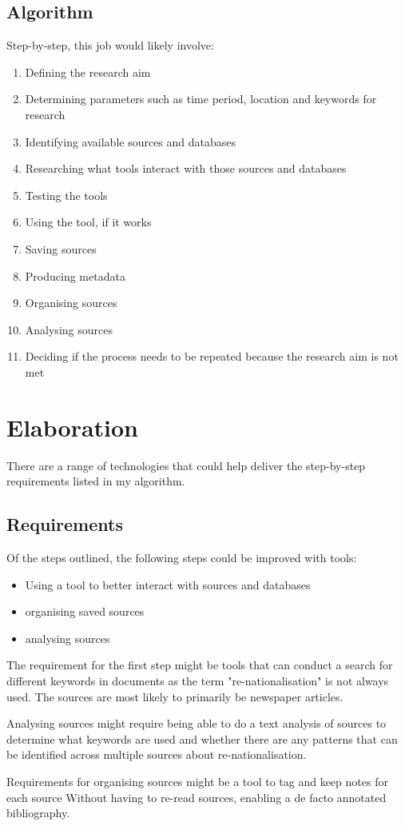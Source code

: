 \documentclass{article}
\begin{document}
\subsection*{Algorithm}
Step-by-step, this job would likely involve:
\begin{enumerate}
\item Defining the research aim
\item Determining parameters such as time period, location and keywords for research
\item Identifying available sources and databases
\item Researching what tools interact with those sources and databases
\item Testing the tools
\item Using the tool, if it works
\item Saving sources
\item Producing metadata
\item Organising sources
\item Analysing sources
\item Deciding if the process needs to be repeated because the research aim is not met
\end{enumerate}

\section*{Elaboration}

There are a range of technologies that could help deliver the step-by-step requirements listed in my algorithm.

\subsection*{Requirements}

Of the steps outlined, the following steps could be improved with tools:
\begin{itemize}
\item Using a tool to better interact with sources and databases
\item organising saved sources
\item analysing sources 
\end{itemize}\par

The requirement for the first step might be tools that can conduct a search for different keywords in documents as the term "re-nationalisation" is not always used. The sources are most likely to primarily be newspaper articles.\par
\par
Analysing sources might require being able to do a text analysis of sources to determine what keywords are used and whether there are any patterns that can be identified across multiple sources about re-nationalisation.
\par
Requirements for organising sources might be a tool to tag and keep notes for each source Without having to re-read sources, enabling a de facto annotated bibliography.
\par
\end{document}
